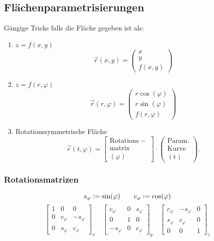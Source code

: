 \subsection{Flächenparametrisierungen}
Gängige Tricks falls die Fläche gegeben ist als:
    \begin{enumerate}
        \item $z = f(x,y)$
            $$
                \vec{r}(x,y) = \begin{pmatrix}
                    x\\y\\f(x,y)
                \end{pmatrix}
            $$
        \item $z = f(r,\varphi)$
            $$
                \vec{r}(r,\varphi) = \begin{pmatrix}
                    r\cos(\varphi)\\r\sin(\varphi)\\f(r,\varphi)
                \end{pmatrix}
            $$
        \item Rotationssymmetrische Fläche
            $$
                \vec{r}(t,\varphi) = \begin{bmatrix}
                    \mathrm{Rotations-}\\\mathrm{matrix}\\(\varphi)
                \end{bmatrix}
                \cdot
                \begin{pmatrix}
                    \mathrm{Param.}\\
                    \mathrm{Kurve}\\
                    \mathrm{(t)}
                \end{pmatrix}.
            $$
    \end{enumerate}
    \subsubsection{Rotationsmatrizen}
        $$
        s_\varphi \vcentcolon= \sin(\varphi) \qquad c_\varphi \vcentcolon= \cos(\varphi)
        $$
        $$
        \begin{bmatrix}
            1 & 0 & 0\\
            0 & c_\varphi &-s_\varphi\\
            0 & s_\varphi & c_\varphi
        \end{bmatrix}_x
        \quad
        \begin{bmatrix}
            c_\varphi &0 & s_\varphi\\
            0 & 1 & 0\\
            -s_\varphi & 0 & c_\varphi
        \end{bmatrix}_y
        \quad\!
        \begin{bmatrix}
            c_\varphi &-s_\varphi& 0\\
            s_\varphi & c_\varphi& 0\\
            0 & 0 & 1
        \end{bmatrix}_z
        $$
